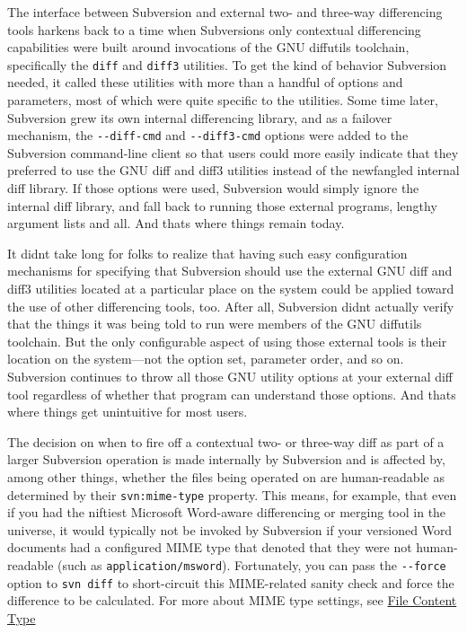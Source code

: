 The interface between Subversion and external two- and three-way
differencing tools harkens back to a time when
Subversion\textquotesingle s only contextual differencing capabilities
were built around invocations of the GNU diffutils toolchain,
specifically the \texttt{diff} and \texttt{diff3} utilities. To get the
kind of behavior Subversion needed, it called these utilities with more
than a handful of options and parameters, most of which were quite
specific to the utilities. Some time later, Subversion grew its own
internal differencing library, and as a failover mechanism, the
\texttt{-\/-diff-cmd} and \texttt{-\/-diff3-cmd} options were added to
the Subversion command-line client so that users could more easily
indicate that they preferred to use the GNU diff and diff3 utilities
instead of the newfangled internal diff library. If those options were
used, Subversion would simply ignore the internal diff library, and fall
back to running those external programs, lengthy argument lists and all.
And that\textquotesingle s where things remain today.

It didn\textquotesingle t take long for folks to realize that having
such easy configuration mechanisms for specifying that Subversion should
use the external GNU diff and diff3 utilities located at a particular
place on the system could be applied toward the use of other
differencing tools, too. After all, Subversion didn\textquotesingle t
actually verify that the things it was being told to run were members of
the GNU diffutils toolchain. But the only configurable aspect of using
those external tools is their location on the system---not the option
set, parameter order, and so on. Subversion continues to throw all those
GNU utility options at your external diff tool regardless of whether
that program can understand those options. And that\textquotesingle s
where things get unintuitive for most users.

The decision on when to fire off a contextual two- or three-way diff as
part of a larger Subversion operation is made internally by Subversion
and is affected by, among other things, whether the files being operated
on are human-readable as determined by their \texttt{svn:mime-type}
property. This means, for example, that even if you had the niftiest
Microsoft Word-aware differencing or merging tool in the universe, it
would typically not be invoked by Subversion if your versioned Word
documents had a configured MIME type that denoted that they were not
human-readable (such as \texttt{application/msword}). Fortunately, you
can pass the \texttt{-\/-force} option to \texttt{svn\ diff} to
short-circuit this MIME-related sanity check and force the difference to
be calculated. For more about MIME type settings, see
\hyperref[svn.advanced.props.special.mime-type]{File Content Type}

